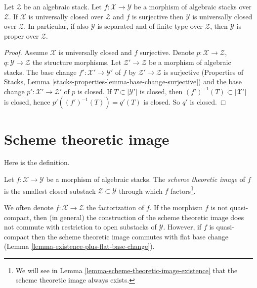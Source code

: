 \begin{lemma}
\label{lemma-image-proper-is-proper}
Let $\mathcal{Z}$ be an algebraic stack.
Let $f : \mathcal{X} \to \mathcal{Y}$
be a morphism of algebraic stacks over $\mathcal{Z}$.
If $\mathcal{X}$ is universally closed over $\mathcal{Z}$
and $f$ is surjective then $\mathcal{Y}$
is universally closed over $\mathcal{Z}$.
In particular, if also $\mathcal{Y}$ is
separated and of finite type over $\mathcal{Z}$,
then $\mathcal{Y}$ is proper over $\mathcal{Z}$.
\end{lemma}

\begin{proof}
Assume $\mathcal{X}$ is universally closed and $f$ surjective.
Denote $p : \mathcal{X} \to \mathcal{Z}$,
$q : \mathcal{Y} \to \mathcal{Z}$ the structure morphisms.
Let $\mathcal{Z}' \to \mathcal{Z}$ be a morphism of algebraic stacks.
The base change $f' : \mathcal{X}' \to \mathcal{Y}'$
of $f$ by $\mathcal{Z}' \to \mathcal{Z}$ is surjective
(Properties of Stacks, Lemma
\ref{stacks-properties-lemma-base-change-surjective}) and the base
change $p' : \mathcal{X}' \to \mathcal{Z}'$ of $p$ is closed.
If $T \subset |\mathcal{Y}'|$ is closed, then
$(f')^{-1}(T) \subset |\mathcal{X}'|$ is closed, hence
$p'((f')^{-1}(T)) = q'(T)$ is closed. So $q'$ is closed.
\end{proof}








\section{Scheme theoretic image}
\label{section-scheme-theoretic-image}

\noindent
Here is the definition.

\begin{definition}
\label{definition-scheme-theoretic-image}
Let $f : \mathcal{X} \to \mathcal{Y}$ be a morphism of algebraic stacks.
The {\it scheme theoretic image} of $f$ is the smallest closed substack
$\mathcal{Z} \subset \mathcal{Y}$ through which $f$
factors\footnote{We will see in
Lemma \ref{lemma-scheme-theoretic-image-existence}
that the scheme theoretic image always exists.}.
\end{definition}

\noindent
We often denote $f : \mathcal{X} \to \mathcal{Z}$ the factorization of $f$.
If the morphism $f$ is not quasi-compact, then (in general) the
construction of the scheme theoretic image does not commute with
restriction to open substacks of $\mathcal{Y}$. However, if $f$ is
quasi-compact then the scheme theoretic image commutes with flat base change
(Lemma \ref{lemma-existence-plus-flat-base-change}).

